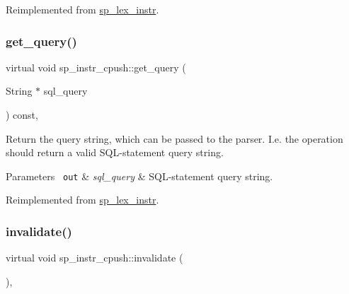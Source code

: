 Reimplemented from \mbox{\hyperlink{classsp__lex__instr_a1cb4c51d92402e942d15ea95e57785dd}{sp\+\_\+lex\+\_\+instr}}.

\mbox{\label{classsp__instr__cpush_acdfc630a526f268fa2b983fe55fc0982}} 
\subsubsection{\texorpdfstring{get\+\_\+query()}{get\_query()}}
{\footnotesize\ttfamily virtual void sp\+\_\+instr\+\_\+cpush\+::get\+\_\+query (\begin{DoxyParamCaption}\item[{String $\ast$}]{sql\+\_\+query }\end{DoxyParamCaption}) const\hspace{0.3cm}{\ttfamily [inline]}, {\ttfamily [virtual]}}

Return the query string, which can be passed to the parser. I.\+e. the operation should return a valid S\+QL-\/statement query string.


\begin{DoxyParams}[1]{Parameters}
\mbox{\texttt{ out}}  & {\em sql\+\_\+query} & S\+QL-\/statement query string. \\
\hline
\end{DoxyParams}


Reimplemented from \mbox{\hyperlink{classsp__lex__instr_a8bbcccae8739634565f8be2134171b03}{sp\+\_\+lex\+\_\+instr}}.

\mbox{\label{classsp__instr__cpush_a0bbf836e06e7be8c7f1fbcfba702d43c}} 
\subsubsection{\texorpdfstring{invalidate()}{invalidate()}}
{\footnotesize\ttfamily virtual void sp\+\_\+instr\+\_\+cpush\+::invalidate (\begin{DoxyParamCaption}{ }\end{DoxyParamCaption})\hspace{0.3cm}{\ttfamily [inline]}, {\ttfamily [virtual]}}

